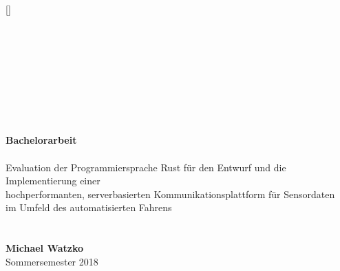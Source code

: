 

\newcommand{\setitle}{Bachelorarbeit}
\newcommand{\seauthor}{Michael Watzko}
\newcommand{\figurewidth}{0.66\textwidth}

\clearscrheadings
\clearscrplain

\pagestyle{scrheadings}	

\ihead[]{\leftmark}
\ohead[]{\rightmark}

\ifoot[]{}
\ofoot[\pagemark]{\pagemark}
\setheadsepline{.4pt}[\color{black}]


\begin{titlepage}
	\centering
	~\\ ~\\ 
	\vspace*{2em}
	~\\ %
	~\\ %
	 ~\\ ~\\ ~\\ ~\\
\textsf{\LARGE{
		\textbf{\setitle} ~\\ ~\\
		Evaluation der Programmiersprache Rust für den
		Entwurf und die Implementierung einer\\hochperformanten,
		serverbasierten Kommunikationsplattform für Sensordaten\\
		im Umfeld des automatisierten Fahrens
	}
	~\\ ~\\ ~\\
	\normalsize \textbf{Michael Watzko} \\
	Sommersemester 2018
}
\end{titlepage}





